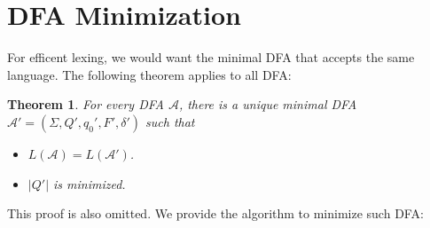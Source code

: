 \documentclass[titlepage]{article}
\theoremstyle{plain}
\newtheorem*{theorem}{Theorem}
\theoremstyle{definition}
\theoremstyle{remark}
\begin{document}
\section{DFA Minimization}
For efficent lexing, we would want the minimal DFA that accepts the same
language. The following theorem applies to all DFA\@:
\begin{theorem}
  For every DFA $\mathcal{A}$, there is a unique minimal DFA
  $\mathcal{A}'=(\Sigma,Q',q_0',F',\delta')$ such that
  \begin{itemize}
    \item $L(\mathcal{A})=L(\mathcal{A}')$.
    \item $|Q'|$ is minimized.
  \end{itemize}
\end{theorem}
This proof is also omitted. We provide the algorithm to minimize such DFA\@:
\end{document}

